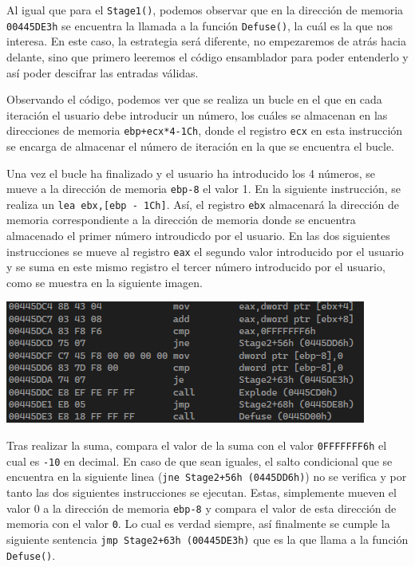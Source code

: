\documentclass[11pt,a4paper]{article}
\begin{document}
Al igual que para el \texttt{Stage1()}, podemos observar que en la dirección de memoria 
\texttt{00445DE3h} se encuentra la llamada a la función \texttt{Defuse()}, la cuál es 
la que nos interesa. En este caso, la estrategia será diferente, no empezaremos de atrás hacia delante, sino 
que primero leeremos el código ensamblador para poder entenderlo y así poder descifrar 
las entradas válidas. 
\vspace{2ex}

Observando el código, podemos ver que se realiza un bucle en el que en cada iteración el
usuario debe introducir un número, los cuáles se almacenan en las direcciones de memoria 
\texttt{ebp+ecx*4-1Ch}, donde el registro \texttt{ecx} en esta instrucción se encarga de almacenar 
el número de iteración en la que se encuentra el bucle. 
\vspace{2ex}

Una vez el bucle ha finalizado y el usuario ha introducido los 4 números, se mueve a la dirección de memoria 
\texttt{ebp-8} el valor 1. En la siguiente instrucción, se realiza un \texttt{lea ebx,[ebp - 1Ch]}. Así, el 
registro \texttt{ebx} almacenará la dirección de memoria correspondiente a la dirección de memoria donde 
se encuentra almacenado el primer número introudicdo por el usuario. En las dos siguientes instrucciones se 
mueve al registro \texttt{eax} el segundo valor introducido por el usuario y se suma en este mismo registro 
el tercer número introducido por el usuario, como se muestra en la siguiente imagen.

\begin{center}
  \includegraphics[width=\textwidth]{Stage 2/ultimoStage2.png}
\end{center}

Tras realizar la suma, compara el valor de la suma con el valor \texttt{0FFFFFFF6h} el cual 
es \texttt{-10} en decimal. En caso de que sean iguales, el salto condicional que se encuentra 
en la siguiente linea (\texttt{jne Stage2+56h (0445DD6h)}) no se verifica y por tanto las dos siguientes instrucciones se ejecutan. 
Estas, simplemente mueven el valor 0 a la dirección de memoria \texttt{ebp-8} y compara el valor 
de esta dirección de memoria con el valor \texttt{0}. Lo cual es verdad siempre, así finalmente se cumple la siguiente 
sentencia \texttt{jmp Stage2+63h (00445DE3h)} que es la que llama a la función \texttt{Defuse()}. 
\vspace{2ex}
\end{document}
